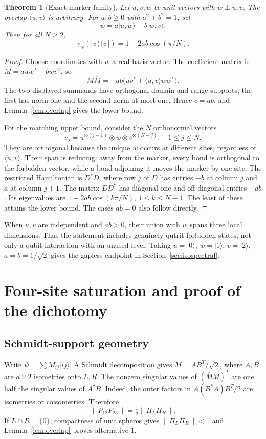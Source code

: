 \documentclass[11pt,a4paper]{article}
\newtheorem{theorem}{Theorem}[section]
\theoremstyle{remark}\newtheorem{remark}[theorem]{Remark}
\newcommand{\ket}[1]{\lvert #1\rangle}
\newcommand{\bra}[1]{\langle #1\rvert}
\newcommand{\norm}[1]{\left\lVert #1\right\rVert}
\begin{document}
\begin{theorem}[Exact marker family]\label{thm:marker}
Let $u,v,w$ be unit vectors with $w\perp u,v$. The overlap $\langle u,v\rangle$ is arbitrary. For $a,b\ge0$ with $a^2+b^2=1$, set
\begin{equation}\label{eq:marker-family}
 \psi=a\ket{u,w}-b\ket{w,v}.
\end{equation}
Then for all $N\ge2$,
\begin{equation}\label{eq:marker-exact}
 \gamma_N(\ket\psi\bra\psi)=1-2ab\cos(\pi/N).
\end{equation}
\end{theorem}
\begin{proof}
Choose coordinates with $w$ a real basis vector. The coefficient matrix is
$M=a u w^T-b w v^T$, so
\[
 M\overline M=-ab\bigl(u v^*+\langle u,v\rangle w w^*\bigr).
\]
The two displayed summands have orthogonal domain and range supports; the first has norm one and the second norm at most one. Hence $c=ab$, and Lemma~\ref{lem:overlap} gives the lower bound.

For the matching upper bound, consider the $N$ orthonormal vectors
\[
 e_j=u^{\otimes(j-1)}\otimes w\otimes v^{\otimes(N-j)},\quad 1\le j\le N.
\]
They are orthogonal because the unique $w$ occurs at different sites, regardless of $\langle u,v\rangle$. Their span is reducing: away from the marker, every bond is orthogonal to the forbidden vector, while a bond adjoining it moves the marker by one site. The restricted Hamiltonian is $D^*D$, where row $j$ of $D$ has entries $-b$ at column $j$ and $a$ at column $j+1$. The matrix $DD^*$ has diagonal one and off-diagonal entries $-ab$. Its eigenvalues are
$1-2ab\cos(k\pi/N)$, $1\le k\le N-1$. The least of these attains the lower bound. The cases $ab=0$ also follow directly.
\end{proof}
When $u,v$ are independent and $ab>0$, their union with $w$ spans three local dimensions. Thus the statement includes genuinely qutrit forbidden states, not only a qubit interaction with an unused level. Taking $u=\ket0$, $w=\ket1$, $v=\ket2$, $a=b=1/\sqrt2$ gives the gapless endpoint in Section~\ref{sec:isospectral}.

\section{Four-site saturation and proof of the dichotomy}\label{sec:saturation}
\subsection{Schmidt-support geometry}
Write $\psi=\sum M_{ij}\ket{ij}$. A Schmidt decomposition gives $M=AB^T/\sqrt2$, where $A,B$ are $d\times2$ isometries onto $L,R$. The nonzero singular values of $(\overline M M)^T$ are one half the singular values of $A^*B$. Indeed, the outer factors in $\overline A(B^*A)B^T/2$ are isometries or coisometries. Therefore
\begin{equation}\label{eq:angleoverlap}
 \norm{P_{12}P_{23}}=\tfrac12\norm{\Pi_L\Pi_R}.
\end{equation}
If $L\cap R=\{0\}$, compactness of unit spheres gives $\norm{\Pi_L\Pi_R}<1$ and Lemma~\ref{lem:overlap} proves alternative 1.
\end{document}
